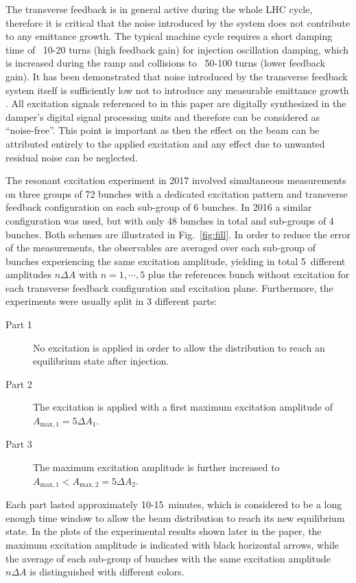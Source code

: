 \documentclass[%
 reprint,
 amsmath,amssymb,
 aps,
prstab,
]{revtex4-1}
\begin{document}
The transverse feedback is in general active during the whole LHC cycle, therefore it is critical that the noise introduced by the system does not contribute to any emittance growth. The typical machine cycle requires a short damping time of ~10-20 turns (high feedback gain) for injection oscillation damping, which is increased during the ramp and collisions to ~50-100 turns (lower feedback gain). It has been demonstrated that noise introduced by the transverse feedback system itself is sufficiently low not to introduce any measurable emittance growth \cite{adt_noise_emit_2017}. All excitation signals referenced to in this paper are digitally synthesized in the damper's digital signal processing units and therefore can be considered as ``noise-free''. This point is important as then the effect on the beam can be attributed entirely to the applied excitation and any effect due to unwanted residual noise can be neglected.

The resonant excitation experiment in 2017 involved simultaneous measurements on three groups of 72 bunches with a dedicated excitation pattern and transverse feedback configuration on each sub-group of 6 bunches. In 2016 a similar configuration was used, but with only 48 bunches in total and sub-groups of 4 bunches. Both schemes are illustrated in Fig.~\ref{fig:fill}. In order to reduce the error of the measurements, the observables are averaged over each sub-group of bunches experiencing the same excitation amplitude, yielding in total 5~different amplitudes $n\Delta A$ with $n=1,\cdots, 5$ plus the references bunch without excitation for each transverse feedback configuration and excitation plane. Furthermore, the experiments were usually split in 3 different parts:
\begin{description}
	\item[Part 1] No excitation is applied in order to allow the distribution to reach an equilibrium state after injection.
	\item[Part 2] The excitation is applied with a first maximum excitation amplitude of $A_{\mathrm{max,1}}=5\Delta A_1$.
	\item[Part 3] The maximum excitation amplitude is further increased to $A_{\mathrm{max,1}} < A_{\mathrm{max,2}}=5\Delta A_2$.
\end{description}
Each part lasted approximately 10-15~minutes, which is considered to be a long enough time window to allow the beam distribution to reach its new equilibrium state. In the plots of the experimental results shown later in the paper, the maximum excitation amplitude is indicated with black horizontal arrows, while the average of each sub-group of bunches with the same excitation amplitude $n\Delta A$ is distinguished with different colors.
\end{document}
